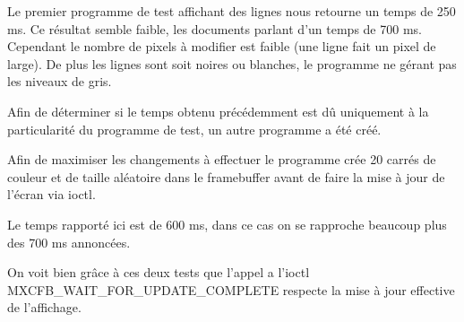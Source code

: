 Le premier programme de test affichant des lignes nous retourne un temps de 250 ms. Ce résultat semble faible, les documents parlant d'un temps de 700 ms. Cependant le nombre de pixels à modifier est faible (une ligne fait un pixel de large). De plus les lignes sont soit noires ou blanches, le programme ne gérant pas les niveaux de gris.

Afin de déterminer si le temps obtenu précédemment est dû uniquement 
à la particularité du programme de test, un autre programme a été créé.

Afin de maximiser les changements à effectuer le programme crée 20 carrés 
de couleur et de taille aléatoire dans le framebuffer avant de faire la mise à jour de l'écran via ioctl.

Le temps rapporté ici est de 600 ms, dans ce cas on se rapproche beaucoup plus des 700 ms annoncées.

On voit bien grâce à ces deux tests que l'appel a l'ioctl MXCFB_WAIT_FOR_UPDATE_COMPLETE respecte la mise à jour effective de l'affichage.